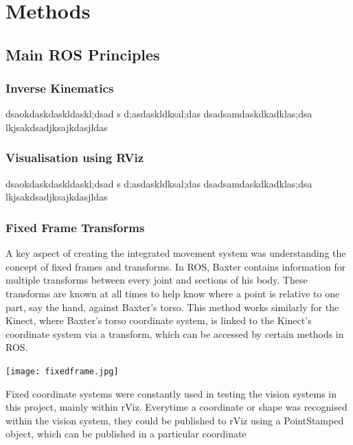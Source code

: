  

\chapter{Methods}
\label{chapter4}
\section{Main ROS Principles}
\subsection{Inverse Kinematics}
dsaokdaskdaskldaskl;dsad
s
d;asdaskldksal;das
dsadsamdaskdkadklas;dsa\newline
lkjsakdsadjksajkdasjldas
\subsection{Visualisation using RViz}
dsaokdaskdaskldaskl;dsad
s
d;asdaskldksal;das
dsadsamdaskdkadklas;dsa\newline
lkjsakdsadjksajkdasjldas
\subsection{Fixed Frame Transforms}
A key aspect of creating the integrated movement system was understanding the concept of fixed frames and transforms. In ROS, Baxter contains information for multiple transforms between every joint and sections of his body. These transforms are known at all times to help know where a point is relative to one part, say the hand, against Baxter's torso. This method works similarly for the Kinect, where Baxter's torso coordinate system, is linked to the Kinect's coordinate system via a transform, which can be accessed by certain methods in ROS.

\begin{minipage}{0.65\textwidth}
\bigskip
\texttt{[image: fixedframe.jpg]}
\bigskip
\end{minipage}
\hspace{0.5cm}
\begin{minipage}{0.29\textwidth}
\raggedright
Fixed coordinate systems were constantly used in testing the vision systems in this project, mainly within rViz. Everytime a coordinate or shape was recognised within the vision system, they could be published to rViz using a PointStamped object, which can be published in a particular coordinate
\end{minipage}

